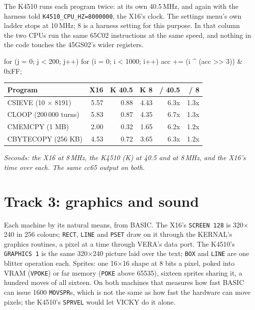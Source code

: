 The K4510 runs each program twice: at its own 40.5\,MHz, and
again with the harness told \texttt{K4510\_CPU\_HZ=8000000},
the X16's clock. The settings menu's own ladder stops at
10\,MHz; 8 is a harness setting for this purpose. In that
column the two CPUs run the same 65C02 instructions at the
same speed, and nothing in the code touches the 45GS02's
wider registers.

\begin{type}
    for (j = 0; j < 200; j++)
        for (i = 0; i < 1000; i++)
            acc += (i ^ (acc >> 3)) & 0xFF;
\end{type}

\begin{center}
\footnotesize
\begin{tabular}{@{}l r r r r r@{}}
\toprule
\textbf{Program} & \textbf{X16} & \textbf{K 40.5} & \textbf{K 8} & \textbf{/ 40.5} & \textbf{/ 8} \\
\midrule
CSIEVE (10 $\times$ 8191) & 5.57 & 0.88 & 4.43 & 6.3x & 1.3x \\
CLOOP (200\,000 turns) & 5.83 & 0.87 & 4.35 & 6.7x & 1.3x \\
CMEMCPY (1 MB) & 2.00 & 0.32 & 1.65 & 6.2x & 1.2x \\
CBYTECOPY (256 KB) & 4.53 & 0.72 & 3.65 & 6.3x & 1.2x \\
\bottomrule
\end{tabular}
\end{center}
\noindent\emph{Seconds: the X16 at 8\,MHz, the K4510 (K) at 40.5 and at
8\,MHz, and the X16's time over each. The same cc65 output on both.}

\section{Track 3: graphics and sound}
Each machine by its natural means, from BASIC. The X16's
\texttt{SCREEN 128} is 320$\times$240 in 256 colours;
\texttt{RECT}, \texttt{LINE} and \texttt{PSET} draw on it
through the KERNAL's graphics routines, a pixel at a time
through VERA's data port. The K4510's \texttt{GRAPHICS 1} is
the same 320$\times$240 picture laid over the text;
\texttt{BOX} and \texttt{LINE} are one blitter operation each.
Sprites: one 16$\times$16 shape at 8 bits a pixel, poked into
VRAM (\texttt{VPOKE}) or far memory (\texttt{POKE} above
65535), sixteen sprites sharing it, a hundred moves of all
sixteen. On both machines that measures how fast BASIC can
issue 1600 \texttt{MOVSPR}s, which is not the same as how fast
the hardware can move pixels; the K4510's \texttt{SPRVEL}
would let VICKY do it alone.

